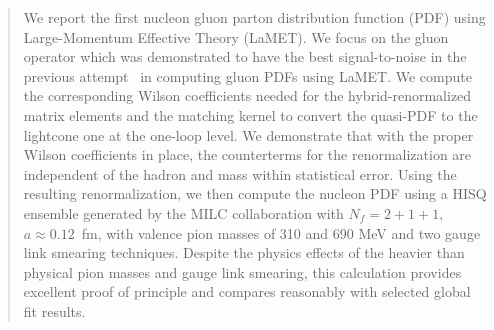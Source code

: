\begin{abstract}
We report the first nucleon gluon parton distribution function (PDF) using Large-Momentum Effective Theory (LaMET).
We focus on the gluon operator which was demonstrated to have the best signal-to-noise in the previous attempt~\cite{Good:2024iur} in computing gluon PDFs using LaMET.
We compute the corresponding Wilson coefficients needed for the hybrid-renormalized matrix elements and the matching kernel to convert the quasi-PDF to the lightcone one at the one-loop level.
We demonstrate that with the proper Wilson coefficients in place, the counterterms for the renormalization are independent of the hadron and mass within statistical error.
Using the resulting renormalization, we then compute the nucleon PDF using a HISQ ensemble generated by the MILC collaboration with $N_f=2+1+1$, $a \approx 0.12$~fm, with valence pion masses of 310 and 690 MeV and two gauge link smearing techniques.
Despite the physics effects of the heavier than physical pion masses and gauge link smearing, this calculation provides excellent proof of principle and compares reasonably with selected global fit results.
\end{abstract}
